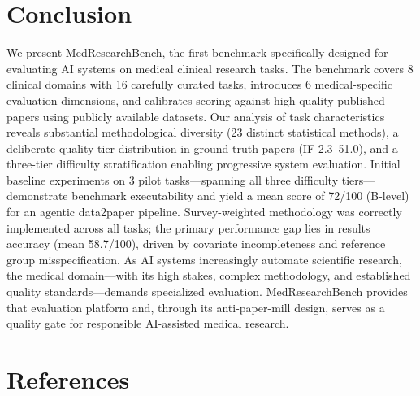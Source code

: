 \documentclass[12pt]{article}
\begin{document}
\section{Conclusion}

We present MedResearchBench, the first benchmark specifically designed for evaluating AI systems on medical clinical research tasks. The benchmark covers 8 clinical domains with 16 carefully curated tasks, introduces 6 medical-specific evaluation dimensions, and calibrates scoring against high-quality published papers using publicly available datasets. Our analysis of task characteristics reveals substantial methodological diversity (23 distinct statistical methods), a deliberate quality-tier distribution in ground truth papers (IF 2.3--51.0), and a three-tier difficulty stratification enabling progressive system evaluation. Initial baseline experiments on 3 pilot tasks---spanning all three difficulty tiers---demonstrate benchmark executability and yield a mean score of 72/100 (B-level) for an agentic data2paper pipeline. Survey-weighted methodology was correctly implemented across all tasks; the primary performance gap lies in results accuracy (mean 58.7/100), driven by covariate incompleteness and reference group misspecification. As AI systems increasingly automate scientific research, the medical domain---with its high stakes, complex methodology, and established quality standards---demands specialized evaluation. MedResearchBench provides that evaluation platform and, through its anti-paper-mill design, serves as a quality gate for responsible AI-assisted medical research.

\section*{References}
\end{document}
